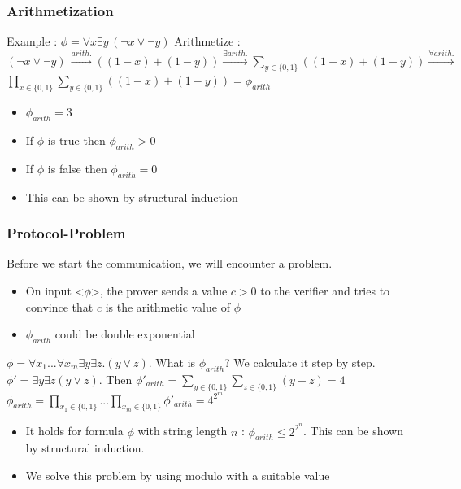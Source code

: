 \documentclass[hyperref={pdfpagelabels=false},t,10pt]{beamer}
\begin{document}
\begin{frame}
  \frametitle{Arithmetization}
  Example : $\phi = \forall x \exists y \, (\neg x \lor \neg y)$ \newline \pause 
  Arithmetize : $(\neg x \lor \neg y) \, \xrightarrow{arith.} ((1-x) + (1-y)) \xrightarrow{\exists arith.} \sum_{y \in \{0,1\}}^{} ((1-x)+(1-y)) \xrightarrow{\forall arith.}$ \pause \newline 
  $\prod_{x \in \{0,1\}}^{} \sum_{y \in \{0,1\}} ((1-x)+(1-y)) = \phi_{arith}$ \newline
  \begin{itemize}
    \item $\phi_{arith} = 3$
    \item If $\phi$ is true then $\phi_{arith} > 0$
    \item If $\phi$ is false then $\phi_{arith} = 0$
    \item This can be shown by structural induction
  \end{itemize}
\end{frame}

\begin{frame}
  \frametitle{Protocol-Problem}
  Before we start the communication, we will encounter a problem. \pause

  \begin{itemize}
    \item On input <$\phi$>, the prover sends a value $c>0$ to the verifier and tries to convince that $c$ is the arithmetic value of $\phi$ \pause
    \item $\phi_{arith}$ could be double exponential
  \end{itemize}

  $\phi = \forall x_1 ... \forall x_m \exists y \exists z. (y \lor z)$. What is $\phi_{arith}$? We calculate it step by step. \newline \pause
  $\phi' = \exists y \exists z (y \lor z)$. Then $\phi'_{arith} = \sum_{y \in \{0,1\}}^{} \sum_{z \in \{0,1\}^{}} (y + z) = 4$ \pause
  $\phi_{arith} = \prod_{x_1 \in \{0,1\}}^{}... \prod_{x_m \in \{0,1\}}^{} \phi'_{arith} = 4^{2^{m}}$ \newline
  \begin{itemize}
    \item It holds for formula $\phi$ with string length $n$ : $\phi_{arith} \leq 2^{2^{n}}$. \newline
    This can be shown by structural induction.
    \item  We solve this problem by using modulo with a suitable value
  \end{itemize}
\end{frame}
\end{document}
